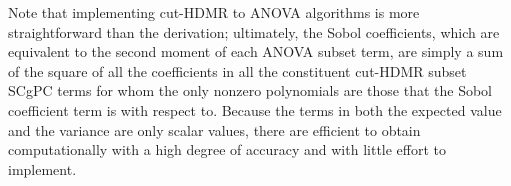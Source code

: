 Note that implementing cut-HDMR to ANOVA algorithms is more straightforward than the derivation; ultimately, the Sobol
coefficients, which are equivalent to the second moment of each ANOVA subset term, are simply a sum of the
square of all the coefficients in all the constituent cut-HDMR subset SCgPC terms for
whom the only nonzero polynomials are those that the Sobol coefficient term is with respect to.  Because the
terms in both the expected value and the variance are only scalar values, there are efficient to obtain
computationally with a high degree of accuracy and with little effort to implement.


